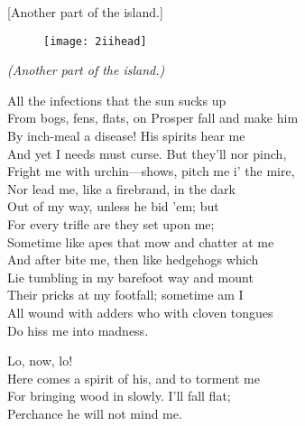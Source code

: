 [Another part of the island.]


\begin{figure}[t]
	\centering
	\texttt{[image: 2iihead]}
\end{figure}

\vspace{\textsink}

\textit{(Another part of the island.)}\centering


\begin{verse_speech}[Caliban] 
All the infections that the sun sucks up\\
From bogs, fens, flats, on Prosper fall and make him\\
By inch-meal a disease! His spirits hear me\\
And yet I needs must curse. But they'll nor pinch,\\
Fright me with urchin—shows, pitch me i' the mire,\\
Nor lead me, like a firebrand, in the dark\\
Out of my way, unless he bid 'em; but\\
For every trifle are they set upon me;\\
Sometime like apes that mow and chatter at me\\
And after bite me, then like hedgehogs which\\
Lie tumbling in my barefoot way and mount\\
Their pricks at my footfall; sometime am I\\
All wound with adders who with cloven tongues\\
Do hiss me into madness.


Lo, now, lo!\\
Here comes a spirit of his, and to torment me\\
For bringing wood in slowly. I'll fall flat;\\
Perchance he will not mind me.
\end{verse_speech}


